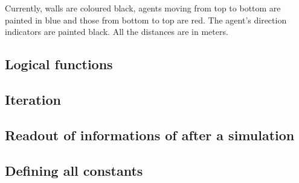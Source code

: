 Currently, walls are coloured black, agents moving from top to bottom are painted in blue and those from bottom to top are red. The agent's direction indicators are painted black. All the distances are in meters.

\subsection{Logical functions}\label{logic}


\subsection{Iteration}


\subsection{Readout of informations of after a simulation}


\subsection{Defining all constants}


\clearpage
